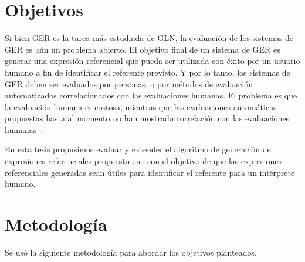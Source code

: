 \section{Objetivos}
\label{objetivos}

Si bien GER es la tarea m\'as estudiada de GLN, la evaluaci\'on de los sistemas de GER es a\'un un problema abierto. El objetivo final de un sistema de GER es generar una expresi\'on referencial que pueda ser utilizada con \'exito por un usuario humano a fin de identificar el referente previsto. Y por lo tanto, los sistemas de GER deben ser evaluados por personas, o por m\'etodos de evaluaci\'on automatizados correlacionados con las evaluaciones humanas. El problema es que la evaluaci\'on humana es costosa, mientras que las evaluaciones autom\'aticas propuestas hasta al momento no han mostrado correlaci\'on con las evaluaciones humanas~\cite{Reiter09}.

En esta tesis propusimos evaluar y extender el algoritmo de generaci\'on de expresiones referenciales propuesto en~\cite{Areces2008} con el objetivo de que las expresiones referenciales generadas sean \'utiles para identificar el referente para un int\'erprete humano. 

\section{Metodolog\'ia}

Se us\'o la siguiente metodolog\'ia para abordar los objetivos planteados.  

